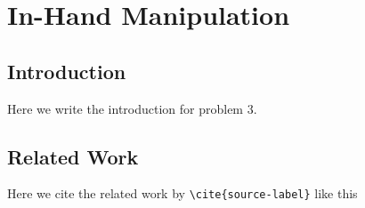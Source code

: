 \chapter{In-Hand Manipulation} \label{ch:3-in-hand-manipulation}

\section{Introduction} \label{sec:3-in-hand-manipulation-introduction}
Here we write the introduction for problem 3.


\section{Related Work} \label{sec:3-in-hand-manipulation-related-work}

Here we cite the related work by \texttt{\textbackslash cite\{source-label\}} like this \cite{recent-progress-in-technologies-for-tactile-sensors}